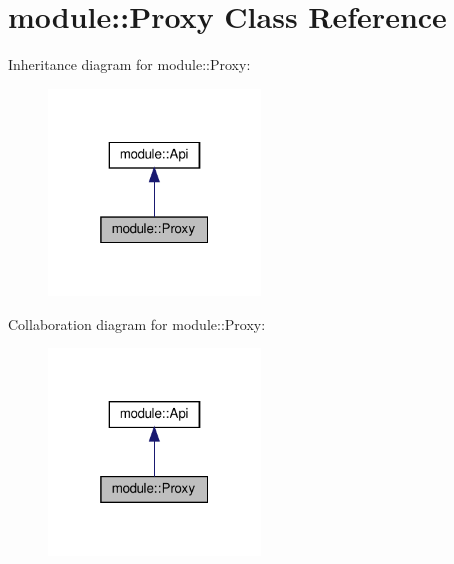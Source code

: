 \hypertarget{classmodule_1_1Proxy}{}\section{module\+:\+:Proxy Class Reference}
\label{classmodule_1_1Proxy}


Inheritance diagram for module\+:\+:Proxy\+:
\nopagebreak
\begin{figure}[H]
\begin{center}
\leavevmode
\includegraphics[width=160pt]{classmodule_1_1Proxy__inherit__graph}
\end{center}
\end{figure}


Collaboration diagram for module\+:\+:Proxy\+:
\nopagebreak
\begin{figure}[H]
\begin{center}
\leavevmode
\includegraphics[width=160pt]{classmodule_1_1Proxy__coll__graph}
\end{center}
\end{figure}
